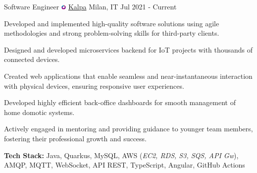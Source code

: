 

\begin{cventries}

  \cventry
    {Software Engineer} %
    {   \includegraphics[width=0.25cm]{cv/images/kalpa-favicon-transparent.png}
        \href{http://www.kalpa.it/en}
        {Kalpa}
    } %
    {Milan, IT} %
    {Jul 2021 - Current} %
    {
      \begin{cvitems} %
        \item {Developed and implemented high-quality software solutions using agile methodologies and strong problem-solving skills for third-party clients.}
        \item {Designed and developed microservices backend for IoT projects with thousands of connected devices.}
        \item {Created web applications that enable seamless and near-instantaneous interaction with physical devices, ensuring responsive user experiences.}
        \item {Developed highly efficient back-office dashboards for smooth management of home domotic systems.}
        \item {Actively engaged in mentoring and providing guidance to younger team members, fostering their professional growth and success.}
        \item {\textbf{Tech Stack:} Java, Quarkus, MySQL, AWS (\textit{EC2, RDS, S3, SQS, API Gw}), AMQP, MQTT, WebSocket, API REST, TypeScript, Angular, GitHub Actions}
      \end{cvitems}
    }


\end{cventries}
